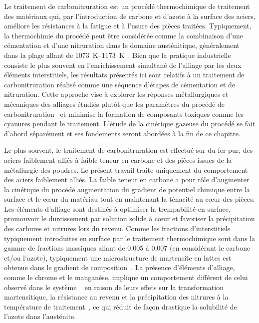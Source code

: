 Le traitement de carbonitruration est un procédé thermochimique de traitement des matériaux qui, par l'introduction de carbone et d'azote à la surface des aciers, améliore les résistances à la fatigue et à l'usure des pièces traitées. Typiquement, la thermochimie du procédé peut être considérée comme la combinaison d'une cémentation et d'une nitruration dans le domaine austénitique, généralement dans la plage allant de \SIrange{1073}{1173}{\kelvin}~\cite{Slycke1981i,Slycke1981ii}. Bien que la pratique industrielle consiste le plus souvent en l'enrichissement simultané de l'alliage par les deux éléments interstitiels, les résultats présentés ici sont relatifs à un traitement de carbonitruration réalisé comme une séquence d'étapes de cémentation et de nitruration. Cette approche vise à explorer les réponses métallurgiques et mécaniques des alliages étudiés plutôt que les paramètres du procédé de carbonitruration~\cite{Slycke1981i,Sproge1988} et minimise la formation de composants toxiques comme les cyanures pendant le traitement. L'étude de la cinétique gazeuse du procédé se fait d'abord séparément et ses fondements seront abordées à la fin de ce chapitre.

Le plus souvent, le traitement de carbonitruration est effectué sur du fer pur, des aciers faiblement alliés à faible teneur en carbone et des pièces issues de la métallurgie des poudres. Le présent travail traite uniquement du comportement des aciers faiblement alliés. La faible teneur en carbone a pour rôle d'augmenter la cinétique du procédé \textendash{} augmentation du gradient de potentiel chimique entre la surface et le c{\oe}ur du matériau \textendash{} tout en maintenant la ténacité au c{\oe}ur des pièces. Les éléments d'alliage sont destinés à optimiser la trempabilité en surface, promouvoir le durcissement par solution solide à c{\oe}ur et favoriser la précipitation des carbures et nitrures lors du revenu. Comme les fractions d'interstitiels typiquement introduites en surface par le traitement thermochimique sont dans la gamme de fractions massiques allant de 0,005 à 0,007 (en considérant le carbone et/ou l'azote), typiquement une microstructure de martensite en lattes est obtenue dans le gradient de composition~\cite{Steel2006}. La présence d'éléments d'alliage, comme le chrome et le manganèse, implique un comportement différent de celui observé dans le système ~\cite{vanGent1985,Mittemeijer1988} en raison de leurs effets sur la transformation martensitique, la résistance au revenu et la précipitation des nitrures à la température de traitement~\cite{Kaplow1983}, ce qui réduit de façon drastique la solubilité de l'azote dans l'austénite.

